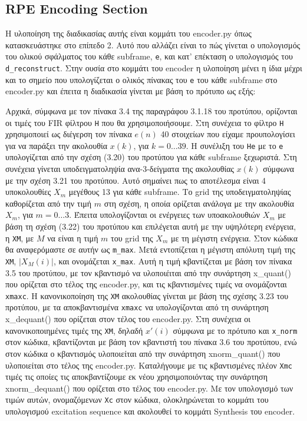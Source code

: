 \documentclass{article}
\begin{document}
\subsection{RPE Encoding Section}

Η υλοποίηση της διαδικασίας αυτής είναι κομμάτι του encoder.py
όπως κατασκευάστηκε στο επίπεδο 2. Αυτό που αλλάζει είναι το
πώς γίνεται ο υπολογισμός του ολικού σφάλματος του κάθε subframe, \verb|e|, 
και κατ' επέκταση ο υπολογισμός του \verb|d_reconstruct|. Στην ουσία στο
κομμάτι του encoder η υλοποίηση μένει η ίδια μέχρι και το σημείο
που υπολογίζεται ο ολικός πίνακας του \verb|e| του κάθε subframe στο encoder.py
και έπειτα η διαδικασία γίνεται με βάση το πρότυπο ως εξής:

Αρχικά, σύμφωνα με τον πίνακα 3.4 της παραγράφου 3.1.18 του προτύπου,
ορίζονται οι τιμές του FIR φίλτρου \verb|H| που θα χρησιμοποιήσουμε.
Στη συνέχεια το φίλτρο \verb|H| χρησιμοποιεί ως διέγερση τον πίνακα
$e(n)$ 40 στοιχείων που είχαμε προυπολογίσει για να παράξει την
ακολουθία $x(k)$, για $k=0\ldots39$. Η συνέλιξη του \verb|He| με το \verb|e| υπολογίζεται από
την σχέση (3.20) του προτύπου για κάθε subframe ξεχωριστά. Στη συνέχεια
γίνεται υποδειγματοληψία ανα-3-δείγματα της ακολουθίας $x(k)$
σύμφωνα με την σχέση 3.21 του προτύπου. Αυτό σημαίνει πως το
αποτέλεσμα είναι 4 υποκολουθίες $X_m$ μεγέθους 13 για κάθε subframe. Το
grid της υποδειγματοληψίας καθορίζεται από την τιμή $m$ στη σχέση,
η οποία ορίζεται ανάλογα με την ακολουθία $X_m$, για $m=0\ldots3$. 
Έπειτα
υπολογίζονται οι ενέργειες των υποακολουθιών $X_m$ με βάση τη
σχέση (3.22) του προτύπου και επιλέγεται αυτή με την υψηλότερη
ενέργεια, η \verb|ΧΜ|, με $M$ να είναι η τιμή $m$ του grid της $X_m$ με τη μέγιστη
ενέργεια. Στον κώδικα θα αναφερόμαστε σε αυτήν ως \verb|m_max|. Μετά
εντοπίζεται η μέγιστη απόλυτη τιμή της \verb|XM|, $|X_M(i)|$, και ονομάζεται
\verb|x_max|. Αυτή η τιμή κβαντίζεται με βάση τον πίνακα 3.5 του προτύπου,
με τον κβαντισμό να υλοποιέιται από την συνάρτηση x\_quant() που
ορίζεται στο τέλος της encoder.py, και τις κβαντισμένες τιμές να
ονομάζονται \verb|xmaxc|. Η κανονικοποίηση της \verb|ΧΜ| ακολουθίας γίνεται
με βάση της σχέσης 3.23 του προτύπου, με τα αποκβαντισμένα \verb|xmaxc|
να υπολογίζονται από τη συνάρτηση x\_dequant() που ορίζεται στον
τέλος του encoder.py. Στη συνέχεια οι κανονικοποιημένες τιμές
της \verb|XM|, δηλαδή $x'(i)$ σύμφωνα με το πρότυπο και \verb|x_norm| στον κώδικα,
κβαντίζονται με βάση τον κβαντιστή του πίνακα 3.6 του προτύπου,
ενώ στον κώδικα ο κβαντισμός υλοποιείται από την συνάρτηση
xnorm\_quant() που υλοποιείται στο τέλος της encoder.py. Καταλήγουμε με τις
κβαντισμένες πλέον \verb|Χmc| τιμές τις οποίες τις αποκβαντίζουμε εκ
νέου χρησιμοποιόντας την συνάρτηση xnorm\_dequant() που ορίζεται στο
τέλος του encoder.py. Με τον υπολογισμό των τιμών αυτών, ονομαζόμενων
\verb|Xc| στον κώδικα, ολοκληρώνεται το κομμάτι του υπολογισμού excitation
sequence και ακολουθεί το κομμάτι Synthesis του encoder.
\end{document}
